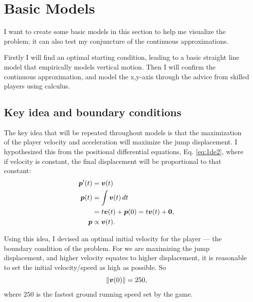 
\section{Basic Models}
I want to create some basic models in this section to help me visualize the problem; it can also test my conjuncture of the continuous approximations.

Firstly I will find an optimal starting condition, leading to a basic straight line model that empirically models vertical motion. Then I will confirm the continuous approximation, and model the x,y-axis
through the advice from skilled players using calculus.

\subsection{Key idea and boundary conditions}
The key idea that will be repeated throughout models is that the maximization of the player velocity and acceleration will maximize the jump displacement. I hypothesized this from the positional differential equations, Eq. \ref{eq:1de2}, where if velocity is constant, the final displacement will be proportional to that constant:
\begin{align*}
    \boldsymbol{p}'(t) &= \boldsymbol{v}(t)\\
    \boldsymbol{p}(t) &= \int \boldsymbol{v}(t) \, dt\\
    &= t\boldsymbol{v}(t) + \boldsymbol{p}(0) = t\boldsymbol{v}(t) + \boldsymbol{0},\\
    \boldsymbol{p} &\propto \boldsymbol{v}(t).
\end{align*}

Using this idea, I devised an optimal initial velocity for the player --- the boundary condition of the problem. For we are maximizing the jump displacement, and higher velocity equates to higher displacement, it is reasonable to set the initial velocity/speed as high as possible. So
\[
    \|\boldsymbol{v}(0)\| = 250,
\]
where $250$ is the fastest ground running speed set by the game.


